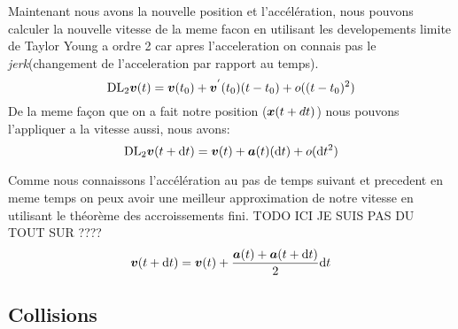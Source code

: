 \documentclass[a4paper, 11pt, oneside]{article} %
\newcommand{\dd}[1]{\mathrm{d}#1}
\begin{document}
        Maintenant nous avons la nouvelle position et l'accélération, nous pouvons calculer la nouvelle vitesse de la meme facon en utilisant les developements limite de Taylor Young a ordre 2 car apres l'acceleration on connais pas le \textit{jerk}(changement de l'acceleration par rapport au temps).
        \begin{equation}
            \mathrm{DL}_2\vb*{v}(t) = \vb*{v}(t_0) + \vb*{v}^{'}(t_0)(t-t_0) + o((t-t_0)^2)
        \end{equation}
        De la meme façon que on a fait notre position ($\vb*{x}(t+dt)$) nous pouvons l'appliquer a la vitesse aussi, nous avons:
        \begin{equation}
            \mathrm{DL}_2\vb*{v}(t+\dd t) = \vb*{v}(t) + \vb*{a}(t)(\dd t) + o(\dd t^2)
        \end{equation}

        Comme nous connaissons l'accélération au pas de temps suivant et precedent en meme temps on peux avoir une meilleur approximation de notre vitesse en utilisant le théorème des accroissements fini. TODO ICI JE SUIS PAS DU TOUT SUR ????
        \begin{equation}
            \label{eq:verletVitesse}
            \vb*{v}(t+\dd t) = \vb*{v}(t)+\frac{\vb*{a}(t)+\vb*{a}(t+\dd t)}{2}\dd t 
        \end{equation}
    \subsection{Collisions}
\end{document}
